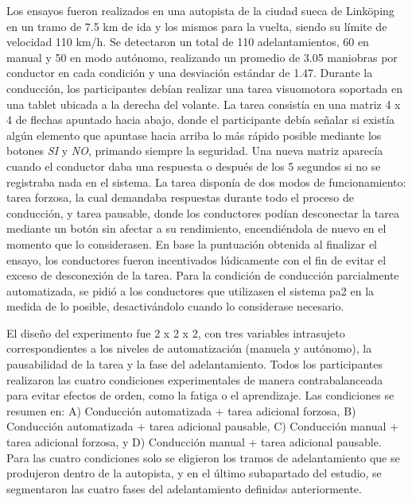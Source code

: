 Los ensayos fueron realizados en una autopista de la ciudad sueca de Linköping en un tramo de 7.5 km de ida y los mismos para la vuelta, siendo su límite de velocidad 110 km/h. Se detectaron un total de 110 adelantamientos, 60 en manual y 50 en modo autónomo, realizando un promedio de 3.05 maniobras por conductor en cada condición y una desviación estándar de 1.47. Durante la conducción, los participantes debían realizar una tarea visuomotora soportada en una tablet ubicada a la derecha del volante. La tarea consistía en una matriz 4 x 4 de flechas apuntado hacia abajo, donde el participante debía señalar si existía algún elemento que apuntase hacia arriba lo más rápido posible mediante los botones \emph{SI} y \emph{NO}, primando siempre la seguridad. Una nueva matriz aparecía cuando el conductor daba una respuesta o después de los 5 segundos si no se registraba nada en el sistema. La tarea disponía de dos modos de funcionamiento: tarea forzosa, la cual demandaba respuestas durante todo el proceso de conducción, y tarea pausable, donde los conductores podían desconectar la tarea mediante un botón sin afectar a su rendimiento, encendiéndola de nuevo en el momento que lo considerasen. En base la puntuación obtenida al finalizar el ensayo, los conductores fueron incentivados lúdicamente con el fin de evitar el exceso de desconexión de la tarea. Para la condición de conducción parcialmente automatizada, se pidió a los conductores que utilizasen el sistema \gls{pa2} en la medida de lo posible, desactivándolo cuando lo considerase necesario. 

El diseño del experimento fue 2 x 2 x 2, con tres variables intrasujeto correspondientes a los niveles de automatización (manuela y autónomo), la pausabilidad de la tarea y la fase del adelantamiento. Todos los participantes realizaron las cuatro condiciones experimentales de manera contrabalanceada para evitar efectos de orden, como la fatiga o el aprendizaje. Las condiciones se resumen en: A) Conducción automatizada + tarea adicional forzosa, B) Conducción automatizada + tarea adicional pausable, C) Conducción manual + tarea adicional forzosa, y D) Conducción manual + tarea adicional pausable. Para las cuatro condiciones solo se eligieron los tramos de adelantamiento que se produjeron dentro de la autopista, y en el último subapartado del estudio, se segmentaron las cuatro fases del adelantamiento definidas anteriormente.

